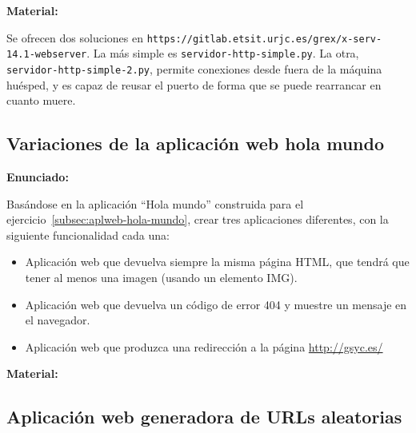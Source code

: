 \textbf{Material:}

Se ofrecen dos soluciones en \verb|https://gitlab.etsit.urjc.es/grex/x-serv-14.1-webserver|. La más simple es \verb|servidor-http-simple.py|. La otra, \verb|servidor-http-simple-2.py|, permite conexiones desde fuera de la máquina huésped, y es capaz de reusar el puerto de forma que se puede rearrancar en cuanto muere.


\subsection{Variaciones de la aplicación web hola mundo}
\label{subsec:aplweb-hola-mundo-var}

\textbf{Enunciado:}

Basándose en la aplicación ``Hola mundo'' construida para el ejercicio~\ref{subsec:aplweb-hola-mundo}, crear tres aplicaciones diferentes, con la siguiente funcionalidad cada una:

\begin{itemize}
\item Aplicación web que devuelva siempre la misma página HTML, que tendrá que tener al menos una imagen (usando un elemento IMG).

\item Aplicación web que devuelva un código de error 404 y muestre un mensaje en el navegador.

\item Aplicación web que produzca una redirección a la página \url{http://gsyc.es/}
\end{itemize}

\textbf{Material:}



\subsection{Aplicación web generadora de URLs aleatorias}
\label{subsec:aplweb-urls-aleatorias}


